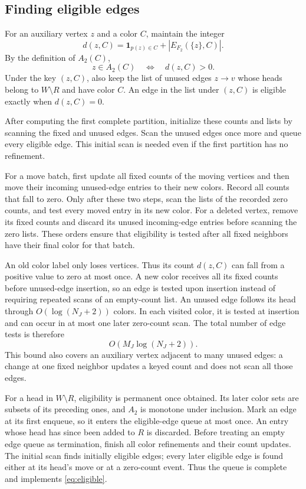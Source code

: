 \documentclass[11pt]{article}
\theoremstyle{definition}
\theoremstyle{remark}
\newcommand{\one}{\mathbf 1}
\begin{document}
\subsection{Finding eligible edges}
For an auxiliary vertex \(z\) and a color \(C\), maintain the integer
\[
 d(z,C)=\one_{p(z)\in C}
       +|E_{F_2}(\{z\},C)|.
\]
By the definition of \(A_2(C)\),
\begin{equation}
 z\in A_2(C)\quad\Longleftrightarrow\quad d(z,C)>0.
 \label{eq:zero-test}
\end{equation}
Under the key \((z,C)\), also keep the list of unused edges \(z\to v\) whose heads belong to \(W\setminus R\) and have color \(C\). An edge in the list under \((z,C)\) is eligible exactly when \(d(z,C)=0\).

After computing the first complete partition, initialize these counts and lists by scanning the fixed and unused edges. Scan the unused edges once more and queue every eligible edge. This initial scan is needed even if the first partition has no refinement.

For a move batch, first update all fixed counts of the moving vertices and then move their incoming unused-edge entries to their new colors. Record all counts that fall to zero. Only after these two steps, scan the lists of the recorded zero counts, and test every moved entry in its new color. For a deleted vertex, remove its fixed counts and discard its unused incoming-edge entries before scanning the zero lists. These orders ensure that eligibility is tested after all fixed neighbors have their final color for that batch.

An old color label only loses vertices. Thus its count \(d(z,C)\) can fall from a positive value to zero at most once. A new color receives all its fixed counts before unused-edge insertion, so an edge is tested upon insertion instead of requiring repeated scans of an empty-count list. An unused edge follows its head through \(O(\log(N_J+2))\) colors. In each visited color, it is tested at insertion and can occur in at most one later zero-count scan. The total number of edge tests is therefore
\begin{equation}
 O(M_J\log(N_J+2)).
 \label{eq:unused-tests}
\end{equation}
This bound also covers an auxiliary vertex adjacent to many unused edges: a change at one fixed neighbor updates a keyed count and does not scan all those edges.

For a head in \(W\setminus R\), eligibility is permanent once obtained. Its later color sets are subsets of its preceding ones, and \(A_2\) is monotone under inclusion. Mark an edge at its first enqueue, so it enters the eligible-edge queue at most once. An entry whose head has since been added to \(R\) is discarded. Before treating an empty edge queue as termination, finish all color refinements and their count updates. The initial scan finds initially eligible edges; every later eligible edge is found either at its head's move or at a zero-count event. Thus the queue is complete and implements \eqref{eq:eligible}.
\end{document}
